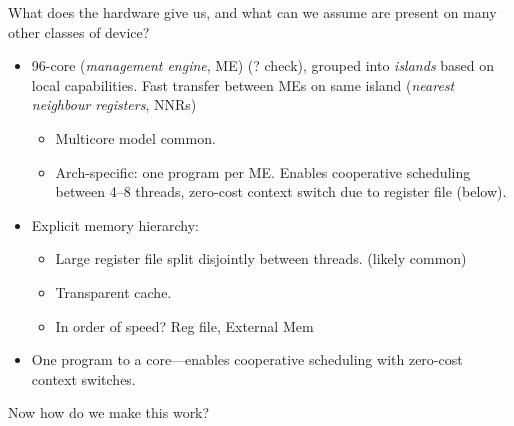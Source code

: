 \documentclass[sigconf,natbib=false]{acmart}
\begin{document}
What does the hardware give us, and what can we assume are present on many other classes of device?
\begin{itemize}
	\item 96-core (\emph{management engine}, ME) (? check), grouped into \emph{islands} based on local capabilities. Fast transfer between MEs on same island (\emph{nearest neighbour registers}, NNRs)
	
	\begin{itemize}
		\item Multicore model common.
		\item Arch-specific: one program per ME. Enables cooperative scheduling between \numrange{4}{8} threads, zero-cost context switch due to register file (below).
	\end{itemize}

	\item Explicit memory hierarchy:
	
	\begin{itemize}
		\item Large register file split disjointly between threads. (likely common)
		\item Transparent cache.
		\item In order of speed? Reg file, External Mem
	\end{itemize}

	\item One program to a core---enables cooperative scheduling with zero-cost context switches.
	
\end{itemize}
Now how do we make this work?
\end{document}
